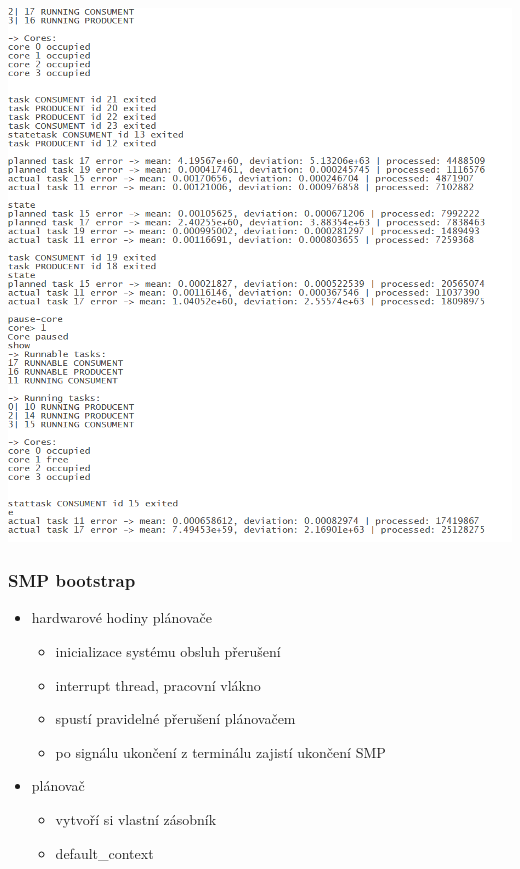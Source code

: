 \documentclass{beamer}
\begin{document}
\begin{frame} 
\includegraphics[height=\textheight]{obrazky/screen.png}

\end{frame}

\begin{frame}
\frametitle{SMP bootstrap}

\begin{itemize}
\item hardwarové hodiny plánovače
\begin{itemize}
  \item inicializace systému obsluh přerušení
  \item interrupt thread, pracovní vlákno
  \item spustí pravidelné přerušení plánovačem
  \item po signálu ukončení z terminálu zajistí ukončení SMP
\end{itemize}

\item plánovač
\begin{itemize}
  \item vytvoří si vlastní zásobník
  \item default\_context
\end{itemize}
\end{itemize}
\end{frame}
\end{document}
